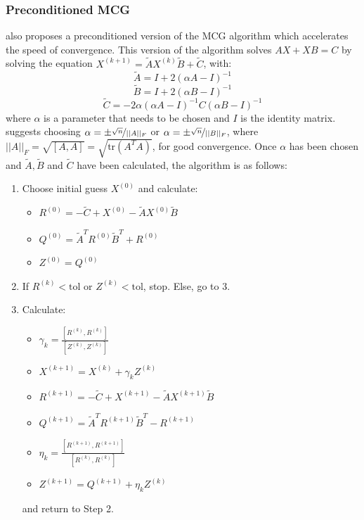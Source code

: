 \documentclass{article}
\numberwithin{equation}{section}
\begin{document}
\subsubsection{Preconditioned MCG}
\cite{Hou} also proposes a preconditioned version of the MCG algorithm which accelerates the speed of convergence. This version of the algorithm solves $AX + XB = C$ by solving the equation 
$X^{(k+1)} = \widetilde{A}X^{(k)} \widetilde{B} + \widetilde{C}$, with:
\[ \widetilde{A} = I + 2(\alpha A - I)^{-1} \]
\[ \widetilde{B} = I + 2(\alpha B - I)^{-1} \]
\[ \widetilde{C} = -2\alpha(\alpha A - I)^{-1} C (\alpha B - I)^{-1} \]
where $\alpha$ is a parameter that needs to be chosen and $I$ is the identity matrix. \cite{Hou} suggests choosing $\alpha = \pm \nicefrac{\sqrt{n}}{||A||_F}$ or $\alpha = \pm \nicefrac{\sqrt{n}}{||B||_F}$, where $||A||_F = \sqrt{[A,A]} = \sqrt{\text{tr}(A^TA)}$, for good convergence. Once $\alpha$ has been chosen and $\widetilde{A}, \widetilde{B}$ and $\widetilde{C}$ have been calculated, the algorithm is as follows:
\begin{enumerate}
\item Choose initial guess $X^{(0)}$ and calculate:
	\begin{itemize}
	\item $R^{(0)} = -\widetilde{C} + X^{(0)} - \widetilde{A}X^{(0)} \widetilde{B}$
	\item $Q^{(0)} = \widetilde{A}^T R^{(0)}\widetilde{B}^T + R^{(0)}$
	\item $Z^{(0)} = Q^{(0)}$
	\end{itemize}
\item If $R^{(k)} < \text{tol}$ or $Z^{(k)} < \text{tol}$, stop. Else, go to 3.
\item Calculate:
	\begin{itemize}
	\item $ \gamma_k = \frac{[R^{(k)}, R^{(k)}]}{[Z^{(k)}, Z^{(k)}]}$
	\item $X^{(k+1)} = X^{(k)} + \gamma_k Z^{(k)} $
	\item $R^{(k+1)} = -\widetilde{C} + X^{(k+1)} - \widetilde{A}X^{(k+1)} \widetilde{B}$
	\item $Q^{(k+1)} = \widetilde{A}^T R^{(k+1)}\widetilde{B}^T - R^{(k+1)}$
	\item $\eta_k = \frac{[R^{(k+1)}, R^{(k+1)}]}{[R^{(k)}, R^{(k)}]}$ 
	\item $Z^{(k+1)} = Q^{(k+1)} + \eta_k Z^{(k)}$
	\end{itemize}
	and return to Step 2.
\end{enumerate}
\end{document}
